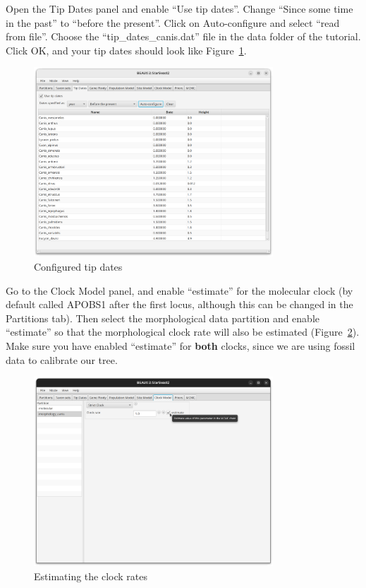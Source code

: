 \documentclass[12pt]{article}
\begin{document}
Open the Tip Dates panel and enable ``Use tip dates''. Change
``Since some time in the past'' to ``before the present''. Click
on Auto-configure and select ``read from file''. Choose the
``tip\_dates\_canis.dat'' file in the data folder of the tutorial.
Click OK, and your tip dates should look like Figure~\ref{fig:tipDates}.

\begin{figure}[htb!]
\centering
\includegraphics[width=0.8\textwidth]{figures/tipDates.png}
\caption
{Configured tip dates}
\label{fig:tipDates}
\end{figure}

Go to the Clock Model panel, and enable ``estimate'' for the
molecular clock (by default called APOBS1 after the first locus, although
this can be changed in the Partitions tab). Then select the morphological
data partition and enable ``estimate'' so that the morphological
clock rate will also be estimated (Figure~\ref{fig:estimateMorphClock}).
Make sure you have enabled ``estimate'' for \textbf{both} clocks, since we
are using fossil data to calibrate our tree.

\begin{figure}[htb!]
\centering
\includegraphics[width=0.8\textwidth]{figures/estimateMorphClock.png}
\caption
{Estimating the clock rates}
\label{fig:estimateMorphClock}
\end{figure}
\end{document}
